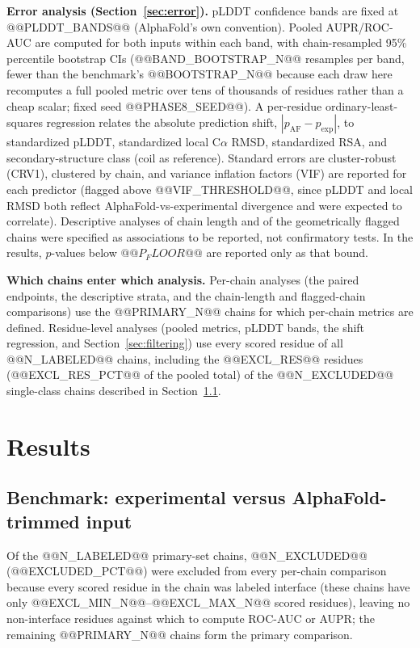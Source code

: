 \documentclass[10pt]{article}
\begin{document}
\textbf{Error analysis (Section~\ref{sec:error}).} pLDDT confidence bands are
fixed at @@PLDDT_BANDS@@ (AlphaFold's own convention). Pooled AUPR/ROC-AUC
are computed for both inputs within each band, with chain-resampled 95\%
percentile bootstrap CIs (@@BAND_BOOTSTRAP_N@@ resamples per band, fewer than
the benchmark's @@BOOTSTRAP_N@@ because each draw here recomputes a full
pooled metric over tens of thousands of residues rather than a cheap scalar;
fixed seed @@PHASE8_SEED@@). A per-residue ordinary-least-squares regression
relates the absolute prediction shift, $|p_{\mathrm{AF}} -
p_{\mathrm{exp}}|$, to standardized pLDDT, standardized local C$\alpha$ RMSD,
standardized RSA, and secondary-structure class (coil as reference). Standard
errors are cluster-robust (CRV1), clustered by chain, and variance inflation
factors (VIF) are reported for each predictor (flagged above
@@VIF_THRESHOLD@@, since pLDDT and local RMSD both reflect
AlphaFold-vs-experimental divergence and were expected to correlate).
Descriptive analyses of chain length and of the geometrically flagged chains
were specified as associations to be reported, not confirmatory tests. In
the results, $p$-values below $@@P_FLOOR@@$ are reported only as that bound.

\textbf{Which chains enter which analysis.} Per-chain analyses (the paired
endpoints, the descriptive strata, and the chain-length and flagged-chain
comparisons) use the @@PRIMARY_N@@ chains for which per-chain metrics are
defined. Residue-level analyses (pooled metrics, pLDDT bands, the shift
regression, and Section~\ref{sec:filtering}) use every scored residue of all
@@N_LABELED@@ chains, including the @@EXCL_RES@@ residues
(@@EXCL_RES_PCT@@ of the pooled total) of the @@N_EXCLUDED@@ single-class
chains described in Section~\ref{sec:benchmark}.

\section{Results}
\label{sec:results}

\subsection{Benchmark: experimental versus AlphaFold-trimmed input}
\label{sec:benchmark}

Of the @@N_LABELED@@ primary-set chains, @@N_EXCLUDED@@ (@@EXCLUDED_PCT@@)
were excluded from every per-chain comparison because every scored residue
in the chain was labeled interface (these chains have only
@@EXCL_MIN_N@@--@@EXCL_MAX_N@@ scored residues), leaving no non-interface
residues against which to compute ROC-AUC or AUPR; the remaining
@@PRIMARY_N@@ chains form the primary comparison.
\end{document}
